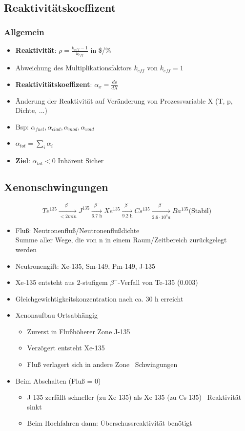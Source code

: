\documentclass[12pt]{article}
\begin{document}
\subsection{Reaktivitätskoeffizent}
\subsubsection{Allgemein}
\begin{itemize}
	\item \textbf{Reaktivität}: \(\rho = \frac{k_{eff} - 1}{k_{eff}}\) in \$/\%
	\item Abweichung des Multiplikationsfaktors \(k_{eff}\) von \(k_{eff} = 1\)
	\item \textbf{Reaktivitätskoeffizent}: \(\alpha_x = \frac{d\rho}{dX}\)
	\item Änderung der Reaktivität auf Veränderung von Prozessvariable X (T, p, Dichte, ...)
	\item Bsp: \(\alpha_{fuel}, \alpha_{clad}, \alpha_{mod}, \alpha_{void}\)
	\item \(\alpha_{tot} = \sum_{i}^{} \alpha_i\)
	\item \textbf{Ziel}: \(\alpha_{tot} < 0\) \textrightarrow Inhärent Sicher
\end{itemize}

\subsection{Xenonschwingungen}
\[
	Te^{135}
	\xrightarrow[< 2 min]{\beta^-}
	J^{135}
	\xrightarrow[\text{6.7 h}]{\beta^-}
	Xe^{135}
	\xrightarrow[\text{9.2 h}]{\beta^-}
	Cs^{135}
	\xrightarrow[2.6\cdot10^4a]{\beta^-}
	Ba^{135} \text{(Stabil)}
\]
\begin{itemize}
	\item Fluß: Neutronenfluß/Neutronenflußdichte\\
		Summe aller Wege, die von n in einem Raum/Zeitbereich zurückgelegt werden
	\item Neutronengift: Xe-135, Sm-149, Pm-149, J-135
	\item Xe-135 entsteht aus 2-stufigem \(\beta^-\)-Verfall von Te-135 (0.003)
	\item Gleichgewichtigkeitskonzentration nach ca. 30 h erreicht
	\item Xenonaufbau Ortsabhängig
		\begin{itemize}
			\item Zurerst in Flußhöherer Zone J-135
			\item Verzögert entsteht Xe-135
			\item Fluß verlagert sich in andere Zone \textrightarrow\ Schwingungen
		\end{itemize}
	\item Beim Abschalten (Fluß = 0)
		\begin{itemize}
			\item J-135 zerfällt schneller (zu Xe-135) als Xe-135 (zu Cs-135) \textrightarrow\ Reaktivität sinkt
			\item Beim Hochfahren dann: Überschussreaktivität benötigt
		\end{itemize}
\end{itemize}
\end{document}

